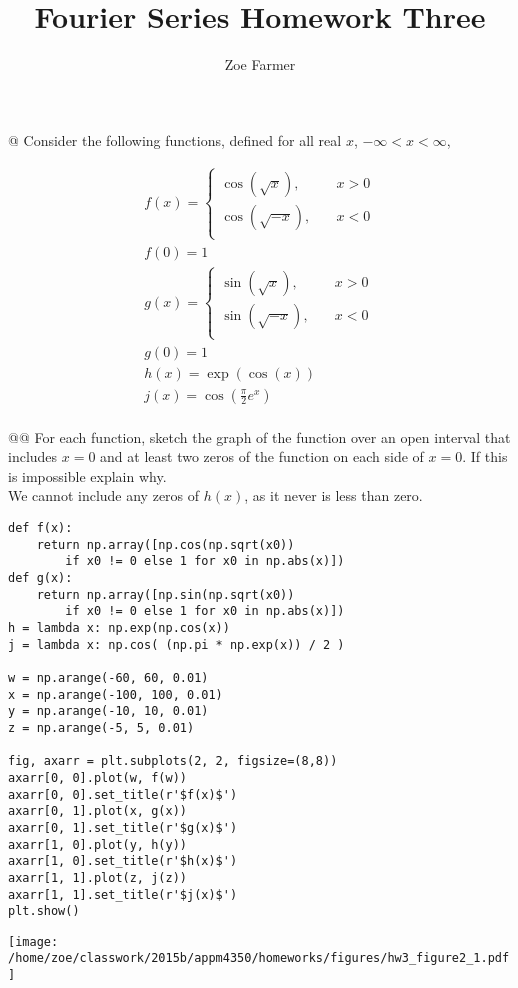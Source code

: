 \documentclass[10pt]{article}
\title{Fourier Series Homework Three}
\author{Zoe Farmer}
\begin{document}
\maketitle

\begin{easylist}[enumerate]
    @ Consider the following functions, defined for all real $x$, $-\infty < x < \infty$,

    \begin{align*}
        f(x) = \begin{cases}
            \cos(\sqrt{x}), \quad &x > 0\\
            \cos(\sqrt{-x}), \quad &x < 0\\
        \end{cases}\\
        f(0) = 1\\
        g(x) = \begin{cases}
            \sin(\sqrt{x}), \quad &x > 0\\
            \sin(\sqrt{-x}), \quad &x < 0\\
        \end{cases}\\
        g(0) = 1\\
        h(x) = \exp(\cos(x))\\
        j(x) = \cos\left(\frac{\pi}{2}e^x\right)\\
    \end{align*}

    @@ For each function, sketch the graph of the function over an open interval that includes $x=0$ and at least two
    zeros of the function on each side of $x=0$. If this is impossible explain why.\\

    We cannot include any zeros of $h(x)$, as it never is less than zero.

\weave

\begin{verbatim}
def f(x):
    return np.array([np.cos(np.sqrt(x0))
        if x0 != 0 else 1 for x0 in np.abs(x)])
def g(x):
    return np.array([np.sin(np.sqrt(x0))
        if x0 != 0 else 1 for x0 in np.abs(x)])
h = lambda x: np.exp(np.cos(x))
j = lambda x: np.cos( (np.pi * np.exp(x)) / 2 )

w = np.arange(-60, 60, 0.01)
x = np.arange(-100, 100, 0.01)
y = np.arange(-10, 10, 0.01)
z = np.arange(-5, 5, 0.01)

fig, axarr = plt.subplots(2, 2, figsize=(8,8))
axarr[0, 0].plot(w, f(w))
axarr[0, 0].set_title(r'$f(x)$')
axarr[0, 1].plot(x, g(x))
axarr[0, 1].set_title(r'$g(x)$')
axarr[1, 0].plot(y, h(y))
axarr[1, 0].set_title(r'$h(x)$')
axarr[1, 1].plot(z, j(z))
axarr[1, 1].set_title(r'$j(x)$')
plt.show()
\end{verbatim}
\texttt{[image: /home/zoe/classwork/2015b/appm4350/homeworks/figures/hw3\_figure2\_1.pdf]}


\end{easylist}
\end{document}
